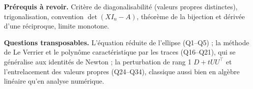 \documentclass[11pt,a4paper]{article}
\begin{document}
\textbf{Prérequis à revoir.} Critère de diagonalisabilité (valeurs propres distinctes), trigonalisation, convention \(\det(XI_n-A)\), théorème de la bijection et dérivée d'une réciproque, limite monotone.

\textbf{Questions transposables.} L'équation réduite de l'ellipse (Q1--Q5) ; la méthode de Le Verrier et le polynôme caractéristique par les traces (Q16--Q21), qui se généralise aux identités de Newton ; la perturbation de rang 1 \(D+tUU^\top\) et l'entrelacement des valeurs propres (Q24--Q34), classique aussi bien en algèbre linéaire qu'en analyse numérique.
\end{document}
